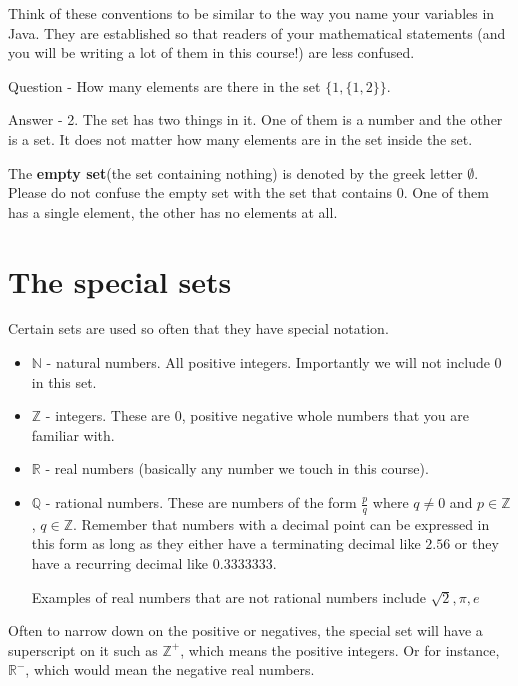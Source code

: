 \documentclass[12pt]{article}
\begin{document}
Think of these conventions to be similar to the way you name your variables in Java. They are established so that readers of your mathematical statements (and you will be writing a lot of them in this course!) are less confused.

\medskip

Question - How many elements are there in the set $\{1, \{1,2\}\}$. 

Answer - 2. The set has two things in it. One of them is a number and the other is a set. It does not matter how many elements are in the set inside the set.

\medskip

The {\bf empty set}(the set containing nothing) is denoted by the greek letter $\emptyset$. Please do not confuse the empty set with the set that contains $0$. One of them has a single element, the other has no elements at all.

\section*{The special sets}

Certain sets are used so often that they have special notation.

\begin{itemize}

\item $\mathbb{N}$ - natural numbers. All positive integers. Importantly we will not include 0 in this set. 

\item $\mathbb{Z}$ - integers. These are 0, positive negative whole numbers that you are familiar with. 

\item $\mathbb{R}$ - real numbers (basically any number we touch in this course). 

\item $\mathbb{Q}$ - rational numbers. These are numbers of the form $\frac{p}{q}$ where $q \neq 0 $ and $p \in \mathbb{Z}$, $q \in \mathbb{Z}$. Remember that numbers with a decimal point can be expressed in this form as long as they either have a terminating decimal like 
$2.56$ or they have a recurring decimal like $0.3333333$.

Examples of real numbers that are not rational numbers include $\sqrt{2}, \pi, e$

\end{itemize}

Often to narrow down on the positive or negatives, the special set will have a superscript on it such as $\mathbb{Z}^+$, which means the positive integers.
Or for instance, $\mathbb{R}^-$, which would mean the negative real numbers.
\end{document}
